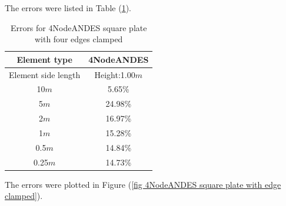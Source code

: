 \documentclass[fleqn,11pt]{article}
\begin{document}
The errors were listed in Table (\ref{table Errors for 4NodeANDES square plate with four edges clamped}).

\begin{table}[H]
  \centering
    \caption{Errors for 4NodeANDES square plate with four edges clamped}
  \label{table Errors for 4NodeANDES square plate with four edges clamped}
\begin{tabular}{|c|c|}
\hline
Element type     & 4NodeANDES          \\ \hline
Element side length & Height:1.00$m$   \\ \hline
10$m$            & 5.65\%         \\ \hline
5$m$             & 24.98\%        \\ \hline
2$m$             & 16.97\%        \\ \hline
1$m$             & 15.28\%        \\ \hline
0.5$m$           & 14.84\%        \\ \hline
0.25$m$          & 14.73\%       \\
\hline
\end{tabular}
\end{table}

The errors were plotted in Figure (\ref{fig 4NodeANDES square plate with edge clamped}).
\end{document}
